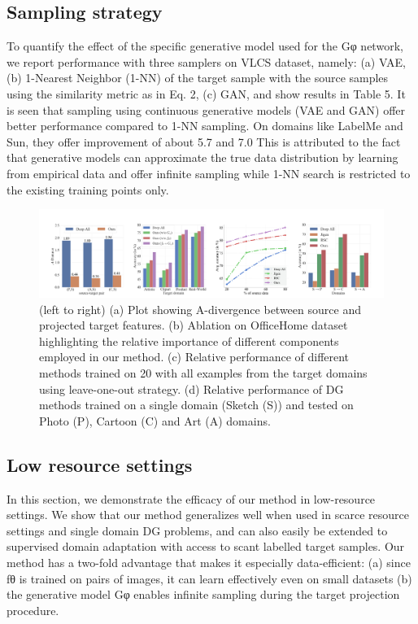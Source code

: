 \documentclass[review]{cvpr}
\begin{document}
\subsection{Sampling strategy}
To quantify the effect of the specific generative model
used for the Gφ network, we report performance with three
samplers on VLCS dataset, namely: (a) VAE, (b) 1-Nearest
Neighbor (1-NN) of the target sample with the source samples using the similarity metric as in Eq. 2, (c) GAN, and
show results in Table 5. It is seen that sampling using continuous generative models (VAE and GAN) offer better performance compared to 1-NN sampling. On domains like
LabelMe and Sun, they offer improvement of about 5.7%
and 7.0%
This is attributed to the fact that generative models can approximate the true data distribution by learning from empirical data and offer infinite sampling while 1-NN search
is restricted to the existing training points only.


\begin{figure}[t]
    \centering
    \includegraphics[width=\textwidth]{fig2.png}
    \caption{ (left to right) (a) Plot showing A-divergence between source and projected target features. (b) Ablation on OfficeHome dataset highlighting the relative importance of different components employed in our method. (c) Relative performance
of different methods trained on 20%
with all examples from the target domains using leave-one-out strategy. (d) Relative performance of DG methods trained on
a single domain (Sketch (S)) and tested on Photo (P), Cartoon (C) and Art (A) domains.}
    \label{fig:fig2}
\end{figure}
\subsection{Low resource settings}
In this section, we demonstrate the efficacy of our
method in low-resource settings. We show that our method
generalizes well when used in scarce resource settings and
single domain DG problems, and can also easily be extended to supervised domain adaptation with access to scant
labelled target samples. Our method has a two-fold advantage that makes it especially data-efficient: (a) since fθ is
trained on pairs of images, it can learn effectively even on
small datasets (b) the generative model Gφ enables infinite
sampling during the target projection procedure.
\end{document}
